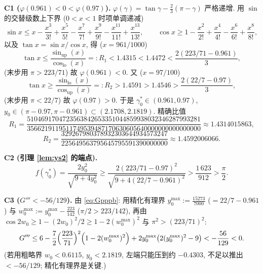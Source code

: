 \documentclass[UTF8]{ctexart}
\begin{document}
\textbf{C1 ($\varphi(0.961)<0<\varphi(0.97)$).}
$\varphi(\gamma)=\tan\gamma-\frac23(\pi-\gamma)$ 严格递增.
用 $\sin$ 的交替级数上下界 ($0<x<1$ 时项单调递减)
\begin{equation*}
	\sin x\le x-\frac{x^3}{3!}+\frac{x^5}{5!}-\frac{x^7}{7!}+\frac{x^9}{9!}
	-\frac{x^{11}}{11!}+\frac{x^{13}}{13!},
	\qquad
	\cos x\ge1-\frac{x^2}{2!}+\frac{x^4}{4!}-\frac{x^6}{6!}+\frac{x^8}{8!},
\end{equation*}
以及 $\tan x=\sin x/\cos x$, 得 ($x=961/1000$)
\begin{equation*}
	\tan x\le\frac{\sin_{\text{up}}(x)}{\cos_{\text{lo}}(x)}=:R_1
	<1.4315<1.4472<\frac{2(223/71-0.961)}3,
\end{equation*}
(末步用 $\pi>223/71$) 故 $\varphi(0.961)<0$. 又 ($x=97/100$)
\begin{equation*}
	\tan x\ge\frac{\sin_{\text{lo}}(x)}{\cos_{\text{up}}(x)}=:R_2
	>1.4591>1.4546>\frac{2(22/7-0.97)}3,
\end{equation*}
(末步用 $\pi<22/7$) 故 $\varphi(0.97)>0$. 于是 $\gamma_0^*\in(0.961,0.97)$,
$y_0\in(\pi-0.97,\pi-0.961)\subset(2.1708,2.1819)$. 精确比值
\begin{equation*}
	R_1=\frac{5104691704723563842653351044859938032346287993281}
	{3566219119511749539487170630605640000000000000000}
	\approx1.4314015863,
\end{equation*}
\begin{equation*}
	R_2=\frac{329267980378932303644934573247}
	{225649563795645795591390000000}\approx1.4592006066.
\end{equation*}

\textbf{C2 (引理 \ref{lem:ys2} 的端点).}
\begin{equation*}
	f(\gamma_0^*)=\frac{2y_0^2}{\sqrt{9+4y_0^2}}
	\ge\frac{2(223/71-0.97)^2}{\sqrt{9+4(22/7-0.961)^2}}
	>\frac{1\,623}{912}>\frac\pi2.
\end{equation*}

\textbf{C3 ($G'''<-56/129$).} 由 \eqref{eq:Gpppb}: 用精化有理界
$y_0^{\max}:=\frac{15273}{7000}$ ($=22/7-0.961$) 与
$w_0^{\max}:=y_0^{\max}-\frac{223}{142}$ ($\pi/2>223/142$),
再由 $\cos2w_0\ge1-(2w_0)^2/2\ge1-2(w_0^{\max})^2$ 与
$\pi^2>(223/71)^2$:
\begin{equation*}
	G'''\le6-\frac{7}{2}\Bigl(\frac{223}{71}\Bigr)^2
	\Bigl(1-2(w_0^{\max})^2\Bigr)+2y_0^{\max}
	\bigl(2(y_0^{\max})^2-9\bigr)
	<-\frac{56}{129}<0.
\end{equation*}
(若用粗略界 $w_0<0.6115$, $y_0<2.1819$, 左端只能压到约 $-0.4303$, 不足以推出
$<-56/129$; 精化有理界是关键.)
\end{document}
